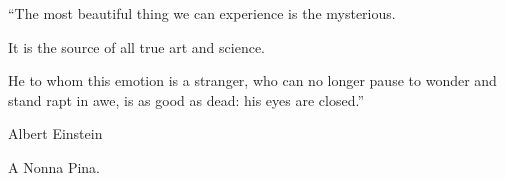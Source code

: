 \documentclass[12pt,a4paper,openright,twoside]{book}
\begin{document}
\begin{abstract}
Across these settings,
making collective structure explicit
(learning groups, interaction neighborhoods, and shared infrastructure conditions)
improves learning and decentralized decisions
without requiring any device to observe or control the entire system.
%

\sloppypar
    \textbf{Keywords} -- \emph{, \gls{CFL}, \gls{MARL}, \gls{MP}}

\end{abstract}

\begin{dedication}
``The most beautiful thing we can experience is the mysterious.

It is the source of all true art and science.

He to whom this emotion is a stranger, who can no longer pause
to wonder and stand rapt in awe, is as good as dead:
his eyes are closed.''

Albert Einstein

\par\vspace{2.5cm}

A Nonna Pina.
\end{dedication}
\end{document}
